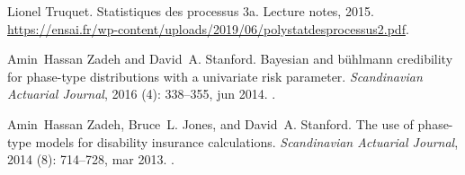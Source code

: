\begin{thebibliography}{11}
Lionel Truquet.
\newblock Statistiques des processus 3a.
\newblock Lecture notes, 2015.
\newblock
  \url{https://ensai.fr/wp-content/uploads/2019/06/polystatdesprocessus2.pdf}.

Amin~Hassan Zadeh and David~A. Stanford.
\newblock Bayesian and bühlmann credibility for phase-type distributions with
  a univariate risk parameter.
\newblock \emph{Scandinavian Actuarial Journal}, 2016 (4):
  338--355, jun 2014.
\newblock {}.

Amin~Hassan Zadeh, Bruce~L. Jones, and David~A. Stanford.
\newblock The use of phase-type models for disability insurance calculations.
\newblock \emph{Scandinavian Actuarial Journal}, 2014 (8):
  714--728, mar 2013.
\newblock {}.

\end{thebibliography}

\newpage